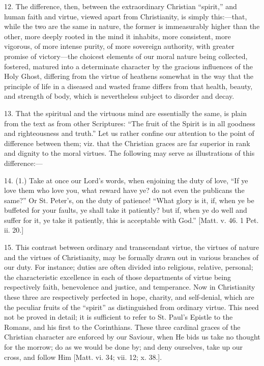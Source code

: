 12. The difference, then, between the extraordinary Christian
``spirit,'' and human faith and virtue, viewed apart from
Christianity, is simply this:—that, while the two are the same in
nature, the former is immeasurably higher than the other, more deeply
rooted in the mind it inhabits, more consistent, more vigorous, of
more intense purity, of more sovereign authority, with greater promise
of victory—the choicest elements of our moral nature being
collected, fostered, matured into a determinate character by the
gracious influences of the Holy Ghost, differing from the virtue of
heathens somewhat in the way that the principle of life in a diseased
and wasted frame differs from that health, beauty, and strength of
body, which is nevertheless subject to disorder and decay.

13. That the spiritual and the virtuous mind are essentially the
same, is plain from the text as from other Scriptures: ``The fruit
of the Spirit is in all goodness and righteousness and truth.''
Let us rather confine our attention to the point of difference between
them; viz. that the Christian graces are far superior in rank and
dignity to the moral virtues. The following may serve as illustrations
of this difference:—

14. (1.) Take at once our Lord's words, when enjoining the duty of
love, ``If ye love them who love you, what reward have ye? do not
even the publicans the same?'' Or St. Peter's, on the duty of
patience! ``What glory is it, if, when ye be buffeted for your
faults, ye shall take it patiently? but if, when ye do well and suffer
for it, ye take it patiently, this is acceptable with God.''
[Matt. v. 46. 1 Pet. ii. 20.]

15. This contrast between ordinary and transcendant virtue, the
virtues of nature and the virtues of Christianity, may be formally
drawn out in various branches of our duty. For instance; duties are
often divided into religious, relative, personal; the characteristic
excellence in each of those departments of virtue being respectively
faith, benevolence and justice, and temperance. Now in Christianity
these three are respectively perfected in hope, charity, and
self-denial, which are the peculiar fruits of the ``spirit''
as distinguished from ordinary virtue. This need not be proved in
detail; it is sufficient to refer to St. Paul's Epistle to the Romans,
and his first to the Corinthians. These three cardinal graces of the
Christian character are enforced by our Saviour, when He bids us take
no thought for the morrow; do as we would be done by; and deny
ourselves, take up our cross, and follow Him [Matt. vi. 34; vii. 12;
x. 38.].

